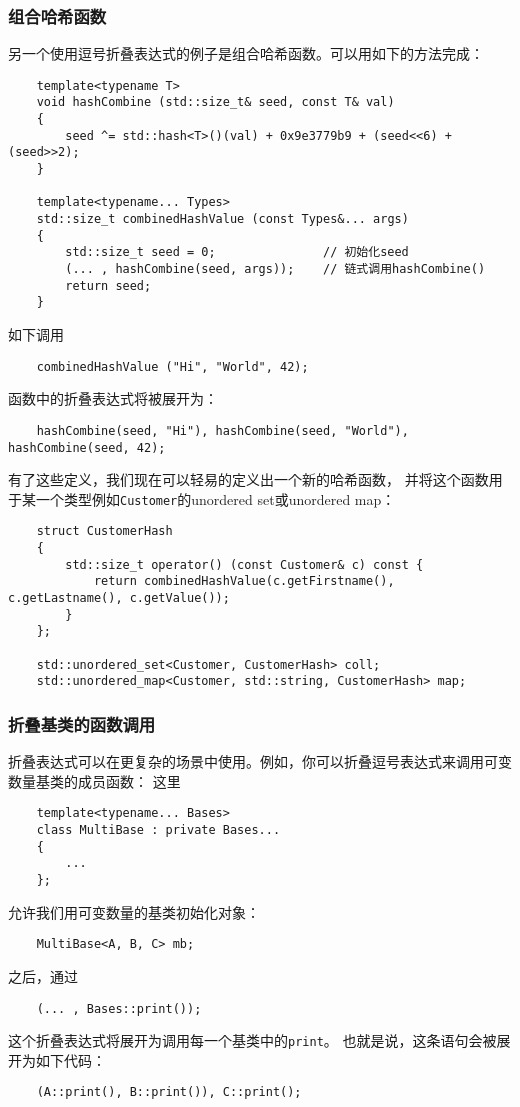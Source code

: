 \subsubsection{组合哈希函数}
另一个使用逗号折叠表达式的例子是组合哈希函数。可以用如下的方法完成：
\begin{lstlisting}
    template<typename T>
    void hashCombine (std::size_t& seed, const T& val)
    {
        seed ^= std::hash<T>()(val) + 0x9e3779b9 + (seed<<6) + (seed>>2);
    }

    template<typename... Types>
    std::size_t combinedHashValue (const Types&... args)
    {
        std::size_t seed = 0;               // 初始化seed
        (... , hashCombine(seed, args));    // 链式调用hashCombine()
        return seed;
    }
\end{lstlisting}
如下调用
\begin{lstlisting}
    combinedHashValue ("Hi", "World", 42);
\end{lstlisting}
函数中的折叠表达式将被展开为：
\begin{lstlisting}
    hashCombine(seed, "Hi"), hashCombine(seed, "World"), hashCombine(seed, 42);
\end{lstlisting}
有了这些定义，我们现在可以轻易的定义出一个新的哈希函数，
并将这个函数用于某一个类型例如\texttt{Customer}的unordered set或unordered map：
\begin{lstlisting}
    struct CustomerHash
    {
        std::size_t operator() (const Customer& c) const {
            return combinedHashValue(c.getFirstname(), c.getLastname(), c.getValue());
        }
    };

    std::unordered_set<Customer, CustomerHash> coll;
    std::unordered_map<Customer, std::string, CustomerHash> map;
\end{lstlisting}

\subsubsection{折叠基类的函数调用}
折叠表达式可以在更复杂的场景中使用。例如，你可以折叠逗号表达式来调用可变数量基类的成员函数：
这里
\begin{lstlisting}
    template<typename... Bases>
    class MultiBase : private Bases...
    {
        ...
    };
\end{lstlisting}
允许我们用可变数量的基类初始化对象：
\begin{lstlisting}
    MultiBase<A, B, C> mb;
\end{lstlisting}
之后，通过
\begin{lstlisting}
    (... , Bases::print());
\end{lstlisting}
这个折叠表达式将展开为调用每一个基类中的\texttt{print}。
也就是说，这条语句会被展开为如下代码：
\begin{lstlisting}
    (A::print(), B::print()), C::print();
\end{lstlisting}

